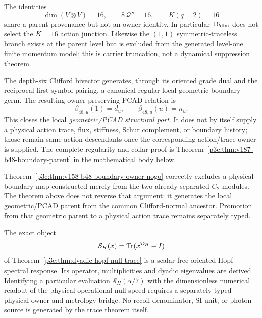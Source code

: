 \documentclass[12pt,a4paper]{article}
\begin{document}
\begin{remark}
\label{p3c:rem:v189-three-sixteens-firewall}
The identities
\[
 \dim(V\otimes V)=16,
 \qquad 8\,\mathscr Q''=16,
 \qquad K(q=2)=16
\]
share a parent provenance but not an owner identity.  In particular
$16_{\rm dim}$ does not select the $K=16$ action junction.  Likewise the
$(1,1)$ symmetric-traceless branch exists at the parent level but is excluded
from the generated level-one finite momentum model; this is carrier truncation,
not a dynamical suppression theorem.
\end{remark}

\begin{theorem}
\label{p3c:thm:v285-main-chain-g25-boundary-parent}
The depth-six Clifford bivector generates, through its oriented grade dual and
the reciprocal first-symbol pairing, a canonical regular local geometric
boundary germ.  The resulting owner-preserving PCAD relation is
\[
 \boxed{\beta_{48,u}(1)=d_u,\qquad \beta_{48,u}(u)=n_u.}
\]
This closes the local \emph{geometric/PCAD structural port}.  It does not by
itself supply a physical action trace, flux, stiffness, Schur complement, or
boundary history; those remain same-action descendants once the corresponding
action/trace owner is supplied.  The complete regularity and collar proof is
Theorem~\ref{p3c:thm:v187-b48-boundary-parent} in the mathematical body below.
\end{theorem}

\begin{remark}
Theorem~\ref{p3c:thm:v158-b48-boundary-owner-nogo} correctly excludes a
physical boundary map constructed merely from the two already separated
\(C_2\) modules.  The theorem above does not reverse that argument: it
generates the local geometric/PCAD parent from the common Clifford-normal
ancestor.  Promotion from that geometric parent to a physical action trace
remains separately typed.
\end{remark}


\begin{corollary}
\label{p3c:cor:v191-dyadic-null-owner-typing}
The exact object
\[
 \mathcal S_H(x)=\operatorname{Tr}(x^{\mathcal D_H}-I)
\]
of Theorem~\ref{p3c:thm:dyadic-hopf-null-trace} is a scalar-free oriented
Hopf spectral response.  Its operator, multiplicities and dyadic eigenvalues
are derived.  Identifying a particular evaluation
$\mathcal S_H(\alpha/7)$ with the dimensionless numerical readout of the
physical operational null speed requires a separately typed physical-owner
and metrology bridge.  No recoil denominator, SI unit, or photon source is
generated by the trace theorem itself.
\end{corollary}
\end{document}
